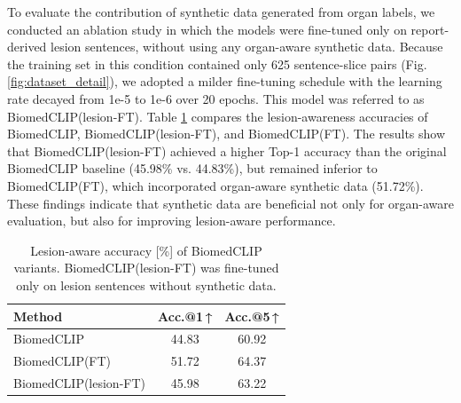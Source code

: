 \documentclass[bioengineering,article,submit,pdftex,moreauthors]{Definitions/mdpi}
\begin{document}
  To evaluate the contribution of synthetic data generated from organ labels, we conducted an ablation study in which the models were fine-tuned only on report-derived lesion sentences, without using any organ-aware synthetic data. 
  Because the training set in this condition contained only 625 sentence-slice pairs (Fig. \ref{fig:dataset_detail}), we adopted a milder fine-tuning schedule with the learning rate decayed from 1e-5 to 1e-6 over 20 epochs. 
  This model was referred to as BiomedCLIP(lesion-FT). 
  Table \ref{tab:impact} compares the lesion-awareness accuracies of BiomedCLIP, BiomedCLIP(lesion-FT), and BiomedCLIP(FT).
  The results show that BiomedCLIP(lesion-FT) achieved a higher Top-1 accuracy than the original BiomedCLIP baseline (45.98\% vs. 44.83\%), but remained inferior to BiomedCLIP(FT), which incorporated organ-aware synthetic data (51.72\%).
  These findings indicate that synthetic data are beneficial not only for organ-aware evaluation, but also for improving lesion-aware performance.


\begin{table}[ht]
  \centering
  \caption{Lesion-aware accuracy [\%] of BiomedCLIP variants. BiomedCLIP(lesion-FT) was fine-tuned only on lesion sentences without synthetic data.}
  \label{tab:impact}
  \begin{tabular}{lcc}
    \toprule
    Method                  & Acc.@1\,↑      & Acc.@5\,↑      \\
    \midrule
    BiomedCLIP              & 44.83       & 60.92       \\
    BiomedCLIP(FT)          & 51.72       & 64.37       \\
    BiomedCLIP(lesion-FT)   & 45.98       & 63.22       \\
    \bottomrule
  \end{tabular}
\end{table}
\end{document}
